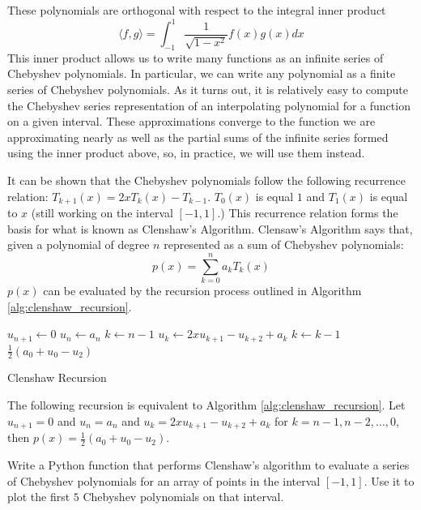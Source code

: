 These polynomials are orthogonal with respect to the integral inner product
\[\langle f, g \rangle = \int_{-1}^1 \frac{1}{\sqrt{1 - x^2}} f\left( x \right) g\left( x \right) dx\]
This inner product allows us to write many functions as an infinite series of Chebyshev polynomials.
In particular, we can write any polynomial as a finite series of Chebyshev polynomials.
As it turns out, it is relatively easy to compute the Chebyshev series representation of an interpolating polynomial for a function on a given interval.
These approximations converge to the function we are approximating nearly as well as the partial sums of the infinite series formed using the inner product above, so, in practice, we will use them instead.

It can be shown that the Chebyshev polynomials follow the following recurrence relation: $ T_{k+1} \left( x \right) = 2 x T_k \left( x \right) - T_{k-1}$.
$T_0 \left( x \right)$ is equal $1$ and $T_1 \left( x \right)$ is equal to $x$ (still working on the interval $[-1, 1]$.)
This recurrence relation forms the basis for what is known as Clenshaw's Algorithm.
Clensaw's Algorithm says that, given a polynomial of degree $n$ represented as a sum of Chebyshev polynomials:
\[p\left(x\right) = \sum_{k=0}^{n} a_k T_k\left(x\right)\]
$p(x)$ can be evaluated by the recursion process outlined in Algorithm \ref{alg:clenshaw_recursion}.

\begin{algorithm}
\begin{algorithmic}[1]
	\State $u_{n+1} \gets 0$
	\State $u_{n} \gets a_{n}$
	\State $k \gets n-1$
		\State $u_k \gets 2 x u_{k+1} - u_{k+2} + a_k$
		\State $k \gets k-1$
	\EndWhile
	\State {} $\frac{1}{2} \left( a_0 + u_0 - u_2 \right)$
\EndProcedure
\end{algorithmic}
\caption{Clenshaw Recursion}
\label{alg:clenshaw_recursion}
\end{algorithm}

The following recursion is equivalent to Algorithm \ref{alg:clenshaw_recursion}.
Let $u_{n+1} = 0$ and $u_{n} = a_n$ and $u_k = 2 x u_{k+1} - u_{k+2} + a_k$ for $k = n-1, n-2, \dots, 0$, then $p(x) = \frac{1}{2} \left( a_0 + u_0 - u_2 \right)$.

\begin{problem}
Write a Python function that performs Clenshaw's algorithm to evaluate a series of Chebyshev polynomials for an array of points in the interval $[-1, 1]$.
Use it to plot the first $5$ Chebyshev polynomials on that interval.
\end{problem}

